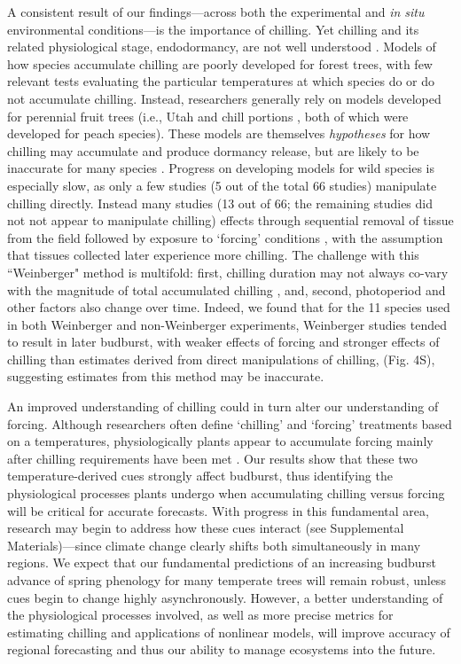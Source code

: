 \documentclass{article}
\begin{document}
\par A consistent result of our findings---across both the experimental and \emph{in situ} environmental conditions---is the importance of chilling. Yet chilling and its related physiological stage, endodormancy, are not well understood \citep{chuine2016}. Models of how species accumulate chilling are poorly developed for forest trees, with few relevant tests evaluating the particular temperatures at which species do or do not accumulate chilling. Instead, researchers generally rely on models developed for perennial fruit trees (i.e., Utah \citep{richardson1974} and chill portions \citep{fishman1987}, both of which were developed for peach species). These models are themselves \emph{hypotheses} for how chilling may accumulate and produce dormancy release, but are likely to be inaccurate for many species \citep{dennis2003}. 
Progress on developing models for wild species is especially slow, as only a few studies (5 out of the total 66 studies) manipulate chilling directly. Instead many studies (13 out of 66; the remaining studies did not not appear to manipulate chilling) effects through sequential removal of tissue from the field followed by exposure to `forcing' conditions \citep{weinberger1950}, with the assumption that tissues collected later experience more chilling. The challenge with this ``Weinberger" method is multifold: first, chilling duration may not always co-vary with the magnitude of total accumulated chilling \citep{dennis2003}, and, second, photoperiod and other factors also change over time. Indeed, we found that for the 11 species used in both Weinberger and non-Weinberger experiments, Weinberger studies tended to result in later budburst, with weaker effects of forcing and stronger effects of chilling than estimates derived from direct manipulations of chilling, \citep{weinberger1950,polgar2013} (Fig. 4S), suggesting estimates from this method may be inaccurate.

\par An improved understanding of chilling could in turn alter our understanding of forcing. Although researchers often define `chilling' and `forcing' treatments based on a temperatures, physiologically plants appear to accumulate forcing mainly after chilling requirements have been met \citep{chuine2016}. Our results show that these two temperature-derived cues strongly affect budburst, thus identifying the physiological processes plants undergo when accumulating chilling versus forcing will be critical for accurate forecasts. With progress in this fundamental area, research may begin to address how these cues interact (see Supplemental Materials)---since climate change clearly shifts both simultaneously in many regions. We expect that our fundamental predictions of an increasing budburst advance of spring phenology for many temperate trees will remain robust, unless cues begin to change highly asynchronously. However, a better understanding of the physiological processes involved, as well as more precise metrics for estimating chilling and applications of nonlinear models, will improve accuracy of regional forecasting and thus our ability to manage ecosystems into the future.
\end{document}
